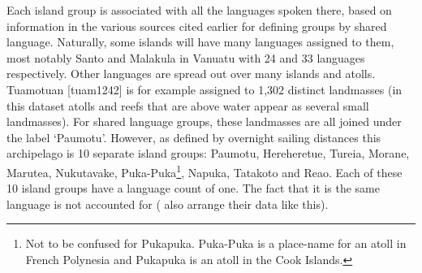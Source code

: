 \documentclass[a4paper,10pt]{article} %
\begin{document}

Each island group is associated with all the languages spoken there, based on information in the various sources cited earlier for defining groups by shared language. Naturally, some islands will have many languages assigned to them, most notably Santo and Malakula in Vanuatu with 24 and 33 languages respectively. Other languages are spread out over many islands and atolls. Tuamotuan [tuam1242] is for example assigned to 1,302 distinct landmasses (in this dataset atolls and reefs that are above water appear as several small landmasses). For shared language groups, these landmasses are all joined under the label `Paumotu'. However, as defined by overnight sailing distances this archipelago is 10 separate island groups: Paumotu, Hereheretue, Tureia, Morane, Marutea, Nukutavake, Puka-Puka\footnote{Not to be confused for Pukapuka. Puka-Puka is a place-name for an atoll in French Polynesia and Pukapuka is an atoll in the Cook Islands.}, Napuka, Tatakoto and Reao. Each of these 10 island groups have a language count of one. The fact that it is the same language is not accounted for (\citet{gavin2012island} also arrange their data like this).
\end{document}
